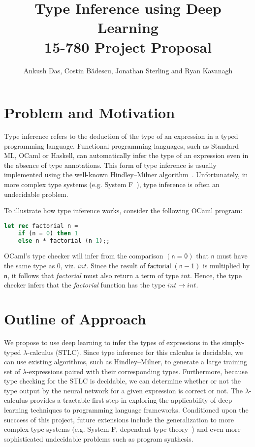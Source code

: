 \documentclass{article}
\title{Type Inference using Deep Learning\\15-780 Project Proposal}
\author{Ankush Das, Costin B\u{a}descu, Jonathan Sterling and Ryan Kavanagh}
\begin{document}
\maketitle

\section{Problem and Motivation}
Type inference refers to the deduction of the type of an expression in a
typed programming language. Functional programming
languages, such as Standard ML, OCaml or Haskell, can automatically infer the
type of an expression even in the absence of type annotations.  This
form of type inference is usually implemented using the well-known
Hindley--Milner algorithm~\cite{hindley1969principal, milner1978theory}.
Unfortunately, in more complex type systems (e.g. System
F~\cite{wells1999typability}), type inference is often an undecidable
problem.

To illustrate how type inference works, consider the following OCaml program:
\begin{lstlisting}[columns=fullflexible, language=Caml]
let rec factorial n =
	if (n = 0) then 1
	else n * factorial (n-1);;
\end{lstlisting}
OCaml's type checker will infer from the comparison $\mathsf{(n = 0)}$
that $\mathsf{n}$ must have the same type as $0$, viz. $int$. Since the
result of $\mathsf{factorial \; (n-1)}$ is multiplied by $\mathsf{n}$,
it follows that \emph{factorial} must also return a term of type
$int$. Hence, the type checker infers that the \emph{factorial} function
has the type $int \to int$.

\section{Outline of Approach}
We propose to use deep learning to infer the types of expressions in the
simply-typed $\lambda$-calculus (STLC). Since type inference for this
calculus is decidable, we can use existing algorithms, such as
Hindley--Milner, to generate a large training set of
$\lambda$-expressions paired with their corresponding
types. Furthermore, because type checking for the STLC is decidable, we
can determine whether or not the type output by the neural network for a
given expression is correct or not. The $\lambda$-calculus provides a
tractable first step in exploring the applicability of deep learning
techniques to programming language frameworks. Conditioned upon the
succcess of this project, future extensions include the generalization
to more complex type systems (e.g. System F, dependent type
theory~\cite{martin-lof:1984}) and even more sophisticated undecidable
problems such as program synthesis.



\end{document}
